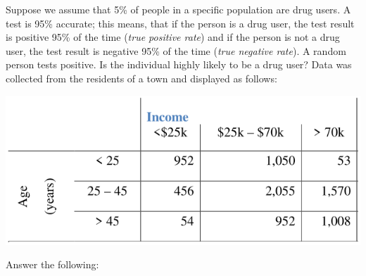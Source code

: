 \documentclass[12pt,addpoints,answers]{exam}
\begin{document}
\begin{questions}
\question Suppose we assume that 5\% of people in a specific population are drug users. A test is 95\% accurate; this means, that if the person is a drug user, the test result is positive 95\% of the time (\emph{true positive rate}) and if the person is not a drug user, the test result is negative 95\% of the time (\emph{true negative rate}). A random person tests positive. Is the individual highly likely to be a drug user?
\question Data was collected from the residents of a town and displayed as follows:
\begin{center}
\includegraphics[keepaspectratio, scale = 0.6]{table.png}
\end{center}
Answer the following:
\end{questions}
\end{document}
